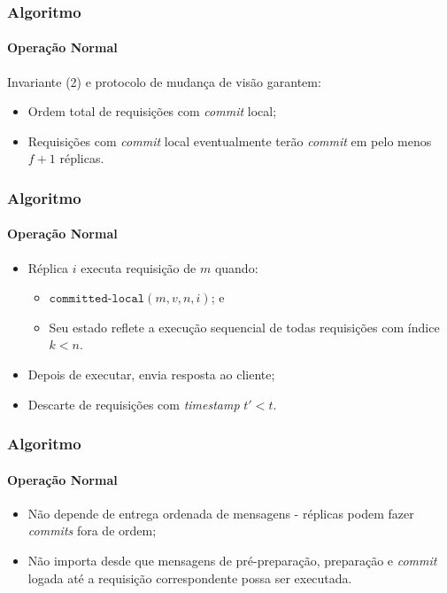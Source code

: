 \documentclass{beamer}
\begin{document}
\begin{frame}
  \frametitle{Algoritmo}
  \framesubtitle{Operação Normal}

  Invariante (2) e protocolo de mudança de visão garantem:
  \begin{itemize}
    \item
      Ordem total de requisições com \textit{commit} local;

    \item
      Requisições com \textit{commit} local eventualmente terão \textit{commit} em pelo menos $f + 1$ réplicas.
  \end{itemize}
\end{frame}

\begin{frame}
  \frametitle{Algoritmo}
  \framesubtitle{Operação Normal}

  \begin{itemize}
    \item
      Réplica $i$ executa requisição de $m$ quando:
      \begin{itemize}
        \item
          $\texttt{committed-local}(m, v, n, i)$; e
          
        \item
          Seu estado reflete a execução sequencial de todas requisições com índice $k < n$.
      \end{itemize}

    \item
      Depois de executar, envia resposta ao cliente;

    \item
      Descarte de requisições com \textit{timestamp} $t' < t$.
  \end{itemize}
\end{frame}

\begin{frame}
  \frametitle{Algoritmo}
  \framesubtitle{Operação Normal}
  
  \begin{itemize}
    \item
      Não depende de entrega ordenada de mensagens - réplicas podem fazer \textit{commits} fora de ordem;

    \item
      Não importa desde que mensagens de pré-preparação, preparação e \textit{commit} logada até a requisição correspondente possa ser executada.
  \end{itemize}
\end{frame}
\end{document}
